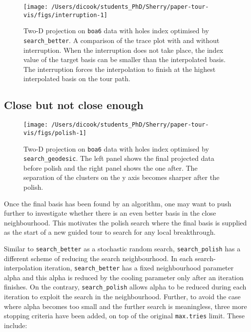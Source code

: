 \documentclass[12pt]{article}
\begin{document}
\begin{figure}

{\centering \texttt{[image: /Users/dicook/students\_PhD/Sherry/paper-tour-vis/figs/interruption-1]} 

}

\caption{Two-D projection on \texttt{boa6} data with holes index optimised by \texttt{search\_better}. A comparison of the trace plot with and without interruption. When the interruption does not take place, the index value of the target basis can be smaller than the interpolated basis. The interruption forces the interpolation to finish at the highest interpolated basis on the tour path.}\label{fig:interruption}
\end{figure}



\hypertarget{close-but-not-close-enough}{%
\subsection{Close but not close enough}\label{close-but-not-close-enough}}

\begin{figure}

{\centering \texttt{[image: /Users/dicook/students\_PhD/Sherry/paper-tour-vis/figs/polish-1]} 

}

\caption{Two-D projection on \texttt{boa6} data with holes index optimised by \texttt{search\_geodesic}. The left panel shows the final projected data before polish and the right panel shows the one after. The separation of the clusters on the y axis becomes sharper after the polish.}\label{fig:polish}
\end{figure}



Once the final basis has been found by an algorithm, one may want to push further to investigate whether there is an even better basis in the close neighbourhood. This motivates the polish search where the final basis is supplied as the start of a new guided tour to search for any local breakthrough.

Similar to \texttt{search\_better} as a stochastic random search, \texttt{search\_polish} has a different scheme of reducing the search neighbourhood. In each search-interpolation iteration, \texttt{search\_better} has a fixed neighbourhood parameter alpha and this alpha is reduced by the cooling parameter only after an iteration finishes. On the contrary, \texttt{search\_polish} allows alpha to be reduced during each iteration to exploit the search in the neighbourhood. Further, to avoid the case where alpha becomes too small and the further search is meaningless, three more stopping criteria have been added, on top of the original \texttt{max.tries} limit. These include:
\end{document}
